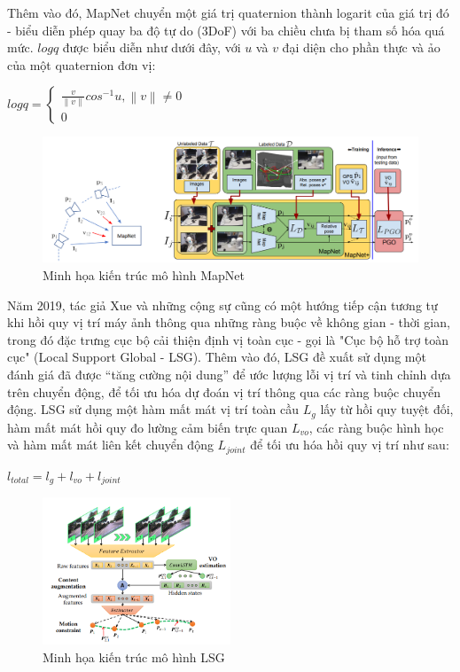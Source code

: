 Thêm vào đó, MapNet chuyển một giá trị quaternion thành logarit của giá trị đó - biểu diễn phép quay ba độ tự do (3DoF) với ba chiều chưa bị tham số hóa quá mức. $logq$ được biểu diễn như dưới đây, với $u$ và $v$ đại diện cho phần thực và ảo của một quaternion đơn vị:
\begin{center}
    $logq =
        \begin{cases}
            \frac{v}{\left \| v \right \|}cos^{-1}u, \left \| v \right \| \neq 0 \\
            0
        \end{cases}$
\end{center}
\begin{figure}[H]
    \centering
    \includegraphics[width=\textwidth]{pics/Chapter2/mapnet.png}
    \caption{Minh họa kiến trúc mô hình MapNet \cite{brahmbhatt2018geometryaware}}
\end{figure}
Năm 2019, tác giả Xue và những cộng sự \cite{xue2019local} cũng có một hướng tiếp cận tương tự khi hồi quy vị trí máy ảnh thông qua những ràng buộc về không gian - thời gian, trong đó đặc trưng cục bộ cải thiện định vị toàn cục - gọi là "Cục bộ hỗ trợ toàn cục" (Local Support Global - LSG). Thêm vào đó, LSG đề xuất sử dụng một đánh giá đã được “tăng cường nội dung” để ước lượng lỗi vị trí và tinh chỉnh dựa trên chuyển động, để tối ưu hóa dự đoán vị trí thông qua các ràng buộc chuyển động. LSG sử dụng một hàm mất mát vị trí toàn cầu $L_g$ lấy từ hồi quy tuyệt đối, hàm mất mát hồi quy đo lường cảm biến trực quan $L_{vo}$, các ràng buộc hình học và hàm mất mát liên kết chuyển động $L_{joint}$ để tối ưu hóa hồi quy vị trí như sau:
\begin{center}
    $l_{total} = l_g + l_{vo} + l_{joint}$
\end{center}
\begin{figure}[H]
    \centering
    \includegraphics[width=0.5\textwidth]{pics/Chapter2/lsg.png}
    \caption{Minh họa kiến trúc mô hình LSG \cite{xue2019local}}
\end{figure}
